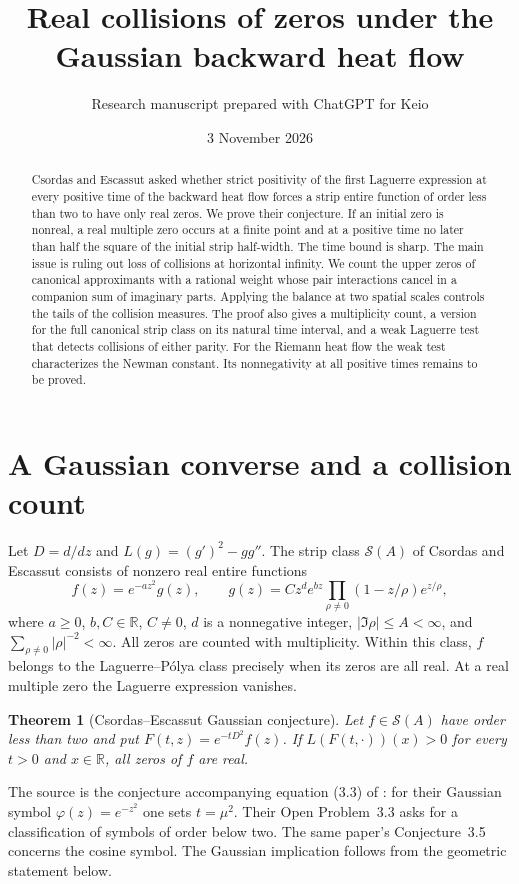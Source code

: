 \documentclass[11pt,a4paper]{article}
\title{Real collisions of zeros under the Gaussian backward heat flow}
\author{Research manuscript prepared with ChatGPT for Keio}
\date{3 November 2026}
\newtheorem{theorem}{Theorem}[section]
\numberwithin{equation}{section}
\begin{document}
\maketitle
\begin{abstract}
Csordas and Escassut asked whether strict positivity of the first
Laguerre expression at every positive time of the backward heat flow
forces a strip entire function of order less than two to have only
real zeros. We prove their conjecture. If an initial zero is nonreal,
a real multiple zero occurs at a finite point and at a positive time
no later than half the square of the initial strip half-width.
The time bound is sharp. The main issue is ruling out loss of
collisions at horizontal infinity. We count the upper zeros of
canonical approximants with a rational weight whose pair interactions
cancel in a companion sum of imaginary parts. Applying the balance at
two spatial scales controls the tails of the collision measures.
The proof also gives a multiplicity count, a version for the full
canonical strip class on its natural time interval, and a weak
Laguerre test that detects collisions of either parity. For the Riemann
heat flow the weak test characterizes the Newman constant. Its
nonnegativity at all positive times remains to be proved.
\end{abstract}
\section{A Gaussian converse and a collision count}
Let $D=d/dz$ and $L(g)=(g')^2-gg''$. The strip class $\mathcal S(A)$
of Csordas and Escassut consists of nonzero real entire functions
\begin{equation}\label{eq:canonical}
 f(z)=e^{-a z^2}g(z),\qquad
 g(z)=Cz^d e^{bz}\prod_{\rho\ne0}(1-z/\rho)e^{z/\rho},
\end{equation}
where $a\ge0$, $b,C\in\mathbb R$, $C\ne0$, $d$ is a nonnegative
integer, $|\Im\rho|\le A<\infty$, and $\sum_{\rho\ne0}|\rho|^{-2}<\infty$.
All zeros are counted with multiplicity. Within this class, $f$ belongs
to the Laguerre--P\'olya class precisely when its zeros are all real.
At a real multiple zero the Laguerre expression vanishes.

\begin{theorem}[Csordas--Escassut Gaussian conjecture]\label{thm:CE}
Let $f\in\mathcal S(A)$ have order less than two and put
$F(t,z)=e^{-tD^2}f(z)$. If $L(F(t,\cdot))(x)>0$ for every
$t>0$ and $x\in\mathbb R$, all zeros of $f$ are real.
\end{theorem}
The source is the conjecture accompanying equation (3.3) of
\cite[pp.~336--337]{CE}: for their Gaussian symbol $\varphi(z)=e^{-z^2}$
one sets $t=\mu^2$. Their Open Problem~3.3 asks for a classification of symbols of order below two.
The same paper's Conjecture~3.5 concerns the
cosine symbol. The Gaussian implication follows from the geometric
statement below.
\end{document}
